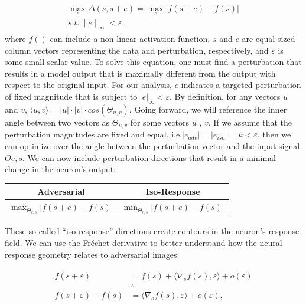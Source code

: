 \begin{align}\label{eq:adv_metric}
\begin{split}
    \max_{e} \Delta (s, s+e) = \max_{e} |f(s+e) - f(s)| \\
    s.t. \|e\|_{\infty} < \varepsilon,
\end{split}
\end{align}
where $f()$ can include a non-linear activation function, $s$ and $e$ are equal sized column vectors representing the data and perturbation, respectively, and $\varepsilon$ is some small scalar value. To solve this equation, one must find a perturbation that results in a model output that is maximally different from the output with respect to the original input. For our analysis, $e$ indicates a targeted perturbation of fixed magnitude that is subject to $|e|_{\infty}<\varepsilon$. By definition, for any vectors $u$ and $v$, $\langle u,v\rangle = |u| \cdot |v| \cdot cos(\Theta_{u,v})$. Going forward, we will reference the inner angle between two vectors as $\Theta_{u,v}$ for some vectors $u$ , $v$. If we assume that the perturbation magnitudes are fixed and equal, i.e.$|e_{adv}| = |e_{iso}| = k < \varepsilon$, then we can optimize over the angle between the perturbation vector and the input signal $\Theta{e,s}$. We can now include perturbation directions that result in a minimal change in the neuron's output:

\begin{center}
    \begin{tabular}{ |c | c| } \hline
     \textbf{Adversarial} & \textbf{Iso-Response} \\ \hline
     $\max_{\Theta_{e,s}}|f(s+e) - f(s)|$ & $\min_{\Theta_{e,s}} | f(s+e) - f(s) |$ \\ \hline
    \end{tabular}
\end{center}

These so called ``iso-response'' directions create contours in the neuron's response field. We can use the Fr\'{e}chet derivative \parencite{citation} to better understand how the neural response geometry relates to adversarial images:

\begin{align}\label{eq:frechet}
\begin{split}
    f(s+\varepsilon) &= f(s) + \langle\nabla_{s}f(s), \varepsilon\rangle + o(\varepsilon)\\
    &\therefore \\
    f(s+\varepsilon) - f(s) &= \langle\nabla_{s}f(s), \varepsilon\rangle+ o(\varepsilon),
\end{split}
\end{align}

